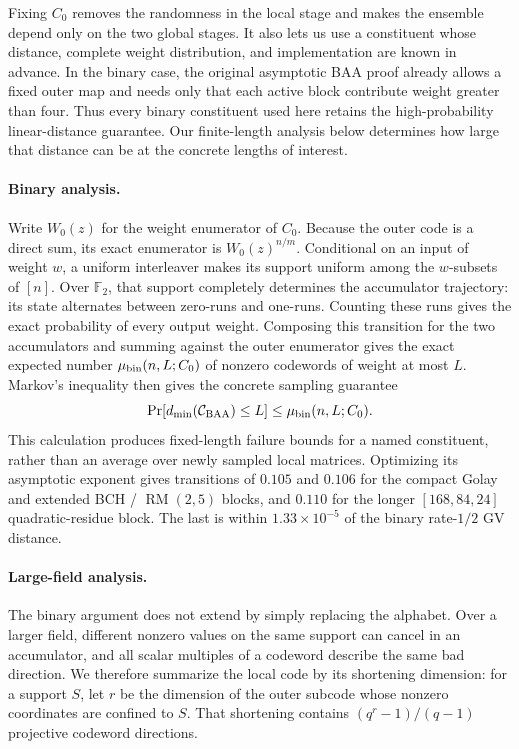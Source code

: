 \documentclass[runningheads,envcountsame,envcountsect]{llncs}
\newcommand{\F}{\mathbb F}
\newcommand{\Prb}{\Pr}
\newcommand{\cC}{\mathcal C}
\begin{document}
Fixing $C_0$ removes the randomness in the local stage and makes the ensemble
depend only on the two global stages.  It also lets us use a constituent whose
distance, complete weight distribution, and implementation are known in
advance.  In the binary case, the original asymptotic BAA proof already allows
a fixed outer map and needs only that each active block contribute weight
greater than four.  Thus every binary constituent used here retains the
high-probability linear-distance guarantee.  Our finite-length analysis below
determines how large that distance can be at the concrete lengths of interest.

\paragraph{Binary analysis.}
Write $W_0(z)$ for the weight enumerator of $C_0$.  Because the outer code is a
direct sum, its exact enumerator is $W_0(z)^{n/m}$.  Conditional on an input of
weight $w$, a uniform interleaver makes its support uniform among the
$w$-subsets of $[n]$.  Over $\F_2$, that support completely determines the
accumulator trajectory: its state alternates between zero-runs and one-runs.
Counting these runs gives the exact probability of every output weight.
Composing this transition for the two accumulators and summing against the outer
enumerator gives the exact expected number $\mu_{\rm bin}(n,L;C_0)$ of nonzero
codewords of weight at most $L$.  Markov's inequality then gives the concrete
sampling guarantee
\[
    \Prb[d_{\min}(\cC_{\rm BAA})\le L]
    \le \mu_{\rm bin}(n,L;C_0).
\]
This calculation produces fixed-length failure bounds for a named constituent,
rather than an average over newly sampled local matrices.  Optimizing its
asymptotic exponent gives transitions of $0.105$ and $0.106$ for the compact
Golay and extended BCH / $\operatorname{RM}(2,5)$ blocks, and $0.110$ for the
longer $[168,84,24]$ quadratic-residue block.  The last is within
$1.33\times10^{-5}$ of the binary rate-$1/2$ GV distance.

\paragraph{Large-field analysis.}
The binary argument does not extend by simply replacing the alphabet.  Over a
larger field, different nonzero values on the same support can cancel in an
accumulator, and all scalar multiples of a codeword describe the same bad
direction.  We therefore summarize the local code by its shortening
dimension: for a support $S$, let $r$ be the dimension of the outer subcode
whose nonzero coordinates are confined to $S$.  That shortening contains
$(q^r-1)/(q-1)$ projective codeword directions.
\end{document}
